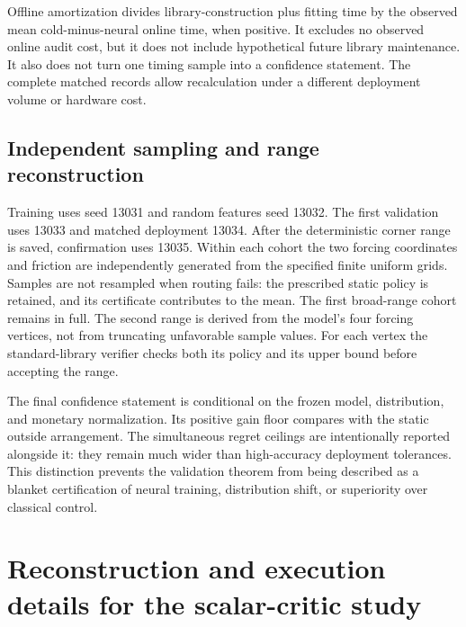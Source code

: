 \documentclass[11pt,letterpaper]{article}
\theoremstyle{definition}
\newcommand{\1}{\mathbf 1}
\begin{document}
Offline amortization divides library-construction plus fitting time by the observed mean cold-minus-neural online time, when positive. It excludes no observed online audit cost, but it does not include hypothetical future library maintenance. It also does not turn one timing sample into a confidence statement. The complete matched records allow recalculation under a different deployment volume or hardware cost.

\subsection{Independent sampling and range reconstruction}
Training uses seed 13031 and random features seed 13032. The first validation uses 13033 and matched deployment 13034. After the deterministic corner range is saved, confirmation uses 13035. Within each cohort the two forcing coordinates and friction are independently generated from the specified finite uniform grids. Samples are not resampled when routing fails: the prescribed static policy is retained, and its certificate contributes to the mean. The first broad-range cohort remains in full. The second range is derived from the model's four forcing vertices, not from truncating unfavorable sample values. For each vertex the standard-library verifier checks both its policy and its upper bound before accepting the range.

The final confidence statement is conditional on the frozen model, distribution, and monetary normalization. Its positive gain floor compares with the static outside arrangement. The simultaneous regret ceilings are intentionally reported alongside it: they remain much wider than high-accuracy deployment tolerances. This distinction prevents the validation theorem from being described as a blanket certification of neural training, distribution shift, or superiority over classical control.



\section{Reconstruction and execution details for the scalar-critic study}\label{ec:r14-details}
\end{document}
